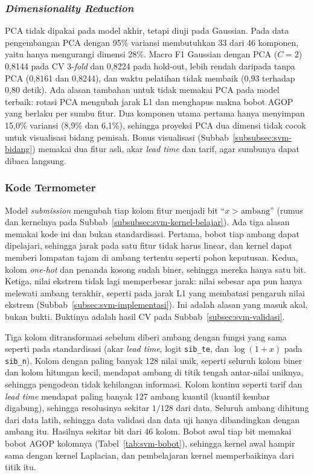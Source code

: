 \subsubsection{\textit{Dimensionality Reduction}}
PCA tidak dipakai pada model akhir, tetapi diuji pada Gaussian. Pada data pengembangan PCA dengan 95\% variansi membutuhkan 33 dari 46 komponen, yaitu hanya mengurangi dimensi 28\%. Macro F1 Gaussian dengan PCA ($C = 2$) 0,8144 pada CV 3-\textit{fold} dan 0,8224 pada hold-out, lebih rendah daripada tanpa PCA (0,8161 dan 0,8244), dan waktu pelatihan tidak membaik (0,93 terhadap 0,80 detik). Ada alasan tambahan untuk tidak memakai PCA pada model terbaik: rotasi PCA mengubah jarak L1 dan menghapus makna bobot AGOP yang berlaku per sumbu fitur. Dua komponen utama pertama hanya menyimpan 15,0\% variansi (8,9\% dan 6,1\%), sehingga proyeksi PCA dua dimensi tidak cocok untuk visualisasi bidang pemisah. Bonus visualisasi (Subbab~\ref{subsubsec:svm-bidang}) memakai dua fitur asli, akar \textit{lead time} dan tarif, agar sumbunya dapat dibaca langsung.

\subsubsection{Kode Termometer}
\label{subsubsec:svm-termometer}
Model \textit{submission} mengubah tiap kolom fitur menjadi bit ``$x > \text{ambang}$'' (rumus dan kernelnya pada Subbab~\ref{subsubsec:svm-kernel-belajar}). Ada tiga alasan memakai kode ini dan bukan standardisasi. Pertama, bobot tiap ambang dapat dipelajari, sehingga jarak pada satu fitur tidak harus linear, dan kernel dapat memberi lompatan tajam di ambang tertentu seperti pohon keputusan. Kedua, kolom \textit{one-hot} dan penanda kosong sudah biner, sehingga mereka hanya satu bit. Ketiga, nilai ekstrem tidak lagi memperbesar jarak: nilai sebesar apa pun hanya melewati ambang terakhir, seperti pada jarak L1 yang membatasi pengaruh nilai ekstrem (Subbab~\ref{subsec:svm-implementasi}). Ini adalah alasan yang masuk akal, bukan bukti. Buktinya adalah hasil CV pada Subbab~\ref{subsec:svm-validasi}.

Tiga kolom ditransformasi sebelum diberi ambang dengan fungsi yang sama seperti pada standardisasi (akar \textit{lead time}, logit \texttt{sib\_te}, dan $\log(1+x)$ pada \texttt{sib\_n}). Kolom dengan paling banyak 128 nilai unik, seperti seluruh kolom biner dan kolom hitungan kecil, mendapat ambang di titik tengah antar-nilai uniknya, sehingga pengodean tidak kehilangan informasi. Kolom kontinu seperti tarif dan \textit{lead time} mendapat paling banyak 127 ambang kuantil (kuantil kembar digabung), sehingga resolusinya sekitar $1/128$ dari data. Seluruh ambang dihitung dari data latih, sehingga data validasi dan data uji hanya dibandingkan dengan ambang itu. Hasilnya sekitar \SVMBaruJumlahBit{} bit dari 46 kolom. Bobot awal tiap bit memakai bobot AGOP kolomnya (Tabel~\ref{tab:svm-bobot}), sehingga kernel awal hampir sama dengan kernel Laplacian, dan pembelajaran kernel memperbaikinya dari titik itu.
